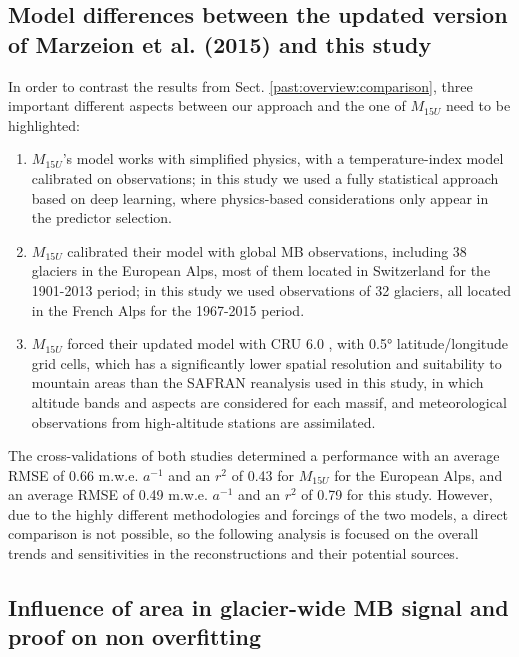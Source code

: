 \subsection{Model differences between the updated version of Marzeion et al. (2015) and this study} \label{past:supp:diff}

In order to contrast the results from Sect. \ref{past:overview:comparison}, three important different aspects between our approach and the one of $M_{15U}$ need to be highlighted: 

\begin{enumerate}
\item $M_{15U}$’s model works with simplified physics, with a temperature-index model calibrated on observations; in this study we used a fully statistical approach based on deep learning, where physics-based considerations only appear in the predictor selection.
\item $M_{15U}$ calibrated their model with global MB observations, including 38 glaciers in the European Alps, most of them located in Switzerland for the 1901-2013 period; in this study we used observations of 32 glaciers, all located in the French Alps for the 1967-2015 period.
\item $M_{15U}$ forced their updated model with CRU 6.0 \citep[update of][]{harris_updated_2014}, with 0.5° latitude/longitude grid cells, which has a significantly lower spatial resolution and suitability to mountain areas than the SAFRAN reanalysis \citep{durand_reanalysis_2009} used in this study, in which altitude bands and aspects are considered for each massif, and meteorological observations from high-altitude stations are assimilated.
\end{enumerate}

The cross-validations of both studies determined a performance with an average RMSE of 0.66 m.w.e. $a^{-1}$ and an $r^{2}$ of 0.43 for $M_{15U}$ for the European Alps, and an average RMSE of 0.49 m.w.e. $a^{-1}$ and an $r^{2}$ of 0.79 for this study. However, due to the highly different methodologies and forcings of the two models, a direct comparison is not possible, so the following analysis is focused on the overall trends and sensitivities in the reconstructions and their potential sources. 

\subsection{Influence of area in glacier-wide MB signal and proof on non overfitting} \label{past:supp:overfitting}

